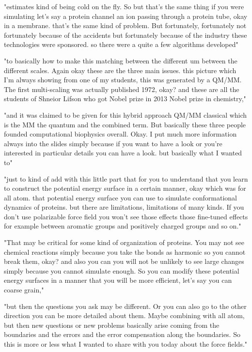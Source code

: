 "estimates kind of being cold on the fly. So but that's the same thing if you were simulating let's say a protein channel an ion passing through a protein tube, okay in a membrane. that's the same kind of problem. But fortunately, fortunately not fortunately because of the accidents but fortunately because of the industry these technologies were sponsored. so there were a quite a few algorithms developed"


"to basically how to make this matching between the different um between the different scales. Again okay these are the three main issues. this picture which I'm always showing from one of my students, this was generated by a QM/MM. The first multi-scaling was actually published 1972, okay? and these are all the students of Shneior Lifson who got Nobel prize in 2013 Nobel prize in chemistry,"


"and it was claimed to be given for this hybrid approach QM/MM classical which is the MM the quantum and the combined term. But basically these three people founded computational biophysics overall. Okay. I put much more information always into the slides simply because if you want to have a look or you're interested in particular details you can have a look. but basically what I wanted to"


"just to kind of add with this little part that for you to understand that you learn to construct the potential energy surface in a certain manner, okay which was for all atom. that potential energy surface you can use to simulate conformational dynamics of proteins. but there are limitations, limitations of many kinds. If you don't use polarizable force field you won't see those effects those fine-tuned effects for example between aromatic groups and positively charged groups and so on."


"That may be critical for some kind of organization of proteins. You may not see chemical reactions simply because you take the bonds as harmonic so you cannot break them, okay? and also you can you will not be unlikely to see large changes simply because you cannot simulate enough. So you can modify these potential energy surfaces in a manner that you will be more efficient, let's say you can coarse grain,"

"but then the questions you ask may be different. Or you can also go to the other direction you can be more detailed about them. Maybe combining with all atom, but then new questions or new problems basically arise coming from the boundaries and the errors and the error compensation along the boundaries. So this is more or less what I wanted to share with you today about the force fields."
